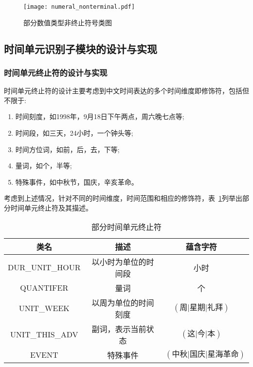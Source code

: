 \begin{figure}[h]
    \centering
    \texttt{[image: numeral\_nonterminal.pdf]}
    \caption{部分数值类型非终止符号类图}
    \label{fig:numeral_nonterminal}
\end{figure}

\subsection{时间单元识别子模块的设计与实现}

\subsubsection{时间单元终止符的设计与实现}

时间单元终止符的设计主要考虑到中文时间表达的多个时间维度即修饰符，包括但不限于:
\begin{enumerate}
    \item 时间刻度，如1998年，9月18日下午两点，周六晚七点等;
    \item 时间段，如三天，24小时，一个钟头等;
    \item 时间方位词，如前，后，去，下等;
    \item 量词，如个，半等;
    \item 特殊事件，如中秋节，国庆，辛亥革命。
\end{enumerate}

考虑到上述情况，针对不同的时间维度，时间范围和相应的修饰符，表~\ref{tab:date_terminal}列举出部分时间单元终止符及其描述。

\begin{table}[h]
    \centering
    \caption{部分时间单元终止符}
    \begin{tabular}{*{4}{c}}
        \toprule
        类名            & 描述                 & 蕴含字符                                 \\
        \midrule
        DUR\_UNIT\_HOUR & 以小时为单位的时间段 & 小时                                     \\
        QUANTIFER       & 量词                 & 个                                       \\
        UNIT\_WEEK      & 以周为单位的时间刻度 & $\left(\text{周|星期|礼拜}\right)$       \\
        UNIT\_THIS\_ADV & 副词，表示当前状态   & $\left(\text{这|今|本}\right)$           \\
        EVENT           & 特殊事件             & $\left(\text{中秋|国庆|星海革命}\right)$ \\
        \bottomrule
    \end{tabular}
    \label{tab:date_terminal}
\end{table}


